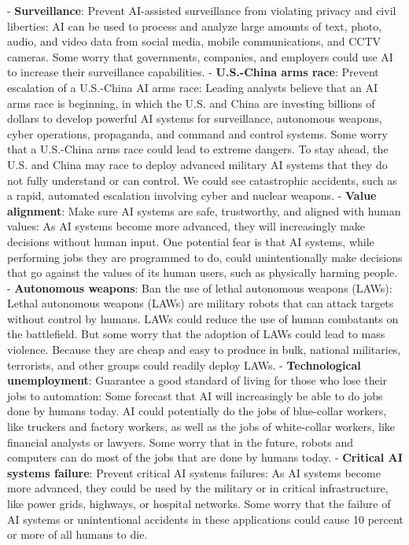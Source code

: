 \documentclass{article}
\begin{document}
-  \textbf{Surveillance}: Prevent AI-assisted surveillance from violating privacy and civil liberties: AI can be used to process and analyze large amounts of text, photo, audio, and video data from social media, mobile communications, and CCTV cameras. Some worry that governments, companies, and employers could use AI to increase their surveillance capabilities.
-  \textbf{U.S.-China arms race}: Prevent escalation of a U.S.-China AI arms race: Leading analysts believe that an AI arms race is beginning, in which the U.S. and China are investing billions of dollars to develop powerful AI systems for surveillance, autonomous weapons, cyber operations, propaganda, and command and control systems. Some worry that a U.S.-China arms race could lead to extreme dangers. To stay ahead, the U.S. and China may race to deploy advanced military AI systems that they do not fully understand or can control. We could see catastrophic accidents, such as a rapid, automated escalation involving cyber and nuclear weapons.
-  \textbf{Value alignment}: Make sure AI systems are safe, trustworthy, and aligned with human values: As AI systems become more advanced, they will increasingly make decisions without human input. One potential fear is that AI systems, while performing jobs they are programmed to do, could unintentionally make decisions that go against the values of its human users, such as physically harming people.
-  \textbf{Autonomous weapons}: Ban the use of lethal autonomous weapons (LAWs): Lethal autonomous weapons (LAWs) are military robots that can attack targets without control by humans. LAWs could reduce the use of human combatants on the battlefield. But some worry that the adoption of LAWs could lead to mass violence. Because they are cheap and easy to produce in bulk, national militaries, terrorists, and other groups could readily deploy LAWs.
-  \textbf{Technological unemployment}: Guarantee a good standard of living for those who lose their jobs to automation: Some forecast that AI will increasingly be able to do jobs done by humans today. AI could potentially do the jobs of blue-collar workers, like truckers and factory workers, as well as the jobs of white-collar workers, like financial analysts or lawyers. Some worry that in the future, robots and computers can do most of the jobs that are done by humans today.
-  \textbf{Critical AI systems failure}: Prevent critical AI systems failures: As AI systems become more advanced, they could be used by the military or in critical infrastructure, like power grids, highways, or hospital networks. Some worry that the failure of AI systems or unintentional accidents in these applications could cause 10 percent or more of all humans to die.
\end{document}
